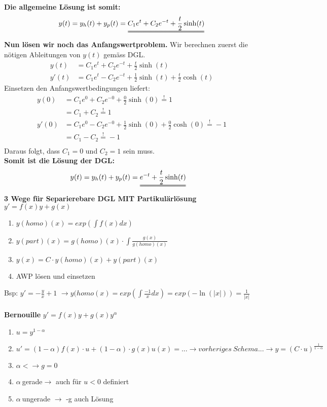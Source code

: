\textbf{Die allgemeine Lösung ist somit:}
\[
	y(t) = y_h(t) + y_p(t) = \uuline{C_1 e^t + C_2 e^{-t} + \frac{t}{2} \sinh(t)}
\]
\textbf{Nun lösen wir noch das Anfangswertproblem.} Wir berechnen zuerst die nötigen Ableitungen von $y(t)$ gemäss DGL. 
\begin{align*}
	y(t) &= C_1 e^t + C_2 e^{-t} + \frac{t}{2} \sinh(t) \\
	y'(t) &= C_1 e^t - C_2 e^{-t} + \frac{1}{2} \sinh(t) + \frac{t}{2} \cosh(t) 
\end{align*}
Einsetzen den Anfangswertbedingungen liefert:
\begin{align*}
	y(0) &= C_1 e^0 + C_2 e^{-0} + \frac{0}{2} \sinh(0) \overset{!}{=} 1 \\
		 &= C_1 + C_2 \overset{!}{=} 1 \\
	y'(0) &= C_1 e^0 - C_2 e^{-0} + \frac{1}{2} \sinh(0) + \frac{0}{2} \cosh(0)  \overset{!}{=} -1 \\
		  &= C_1 - C_2 \overset{!}{=} -1 \\
\end{align*}
Daraus folgt, dass $C_1 = 0$ und $C_2 = 1$ sein muss. \\
\textbf{Somit ist die Lösung der DGL:}
\begin{align*}
	y(t) &= y_h(t) + y_p(t) = \uuline{e^{-t} + \frac{t}{2} \sinh(t)}
\end{align*}
\textbf{3 Wege für Separierebare DGL MIT Partikulärlösung}
$y'=f(x)y+g(x)$
\begin{enumerate}
	\item $y(homo)(x)= exp(\int f(x)dx)$
	\item $y(part)(x) = g(homo)(x)\cdot \int\frac{g(x)}{g(homo)(x)}$
	\item $y(x) = C\cdot y(homo)(x) + y(part)(x)$
	\item AWP lösen und einsetzen 
\end{enumerate}
Bsp: $ y'= -\frac{y}{x} +1 $
$\rightarrow y(homo(x) = exp(\int\frac{-1}{x}dx) = exp(-\ln(|x|)) = \frac{1}{|x|}$\\
\\
\textbf{Bernouille}
$y' = f(x)y + g(x)y^\alpha$
\begin{enumerate}
	\item$ u = y^{1-\alpha}$
	\item$ u' = (1-\alpha)f(x)\cdot u +(1-\alpha)\cdot g(x)
	u(x) = ... \rightarrow vorheriges\ Schema... \rightarrow y=(C\cdot u)^{\frac{1}{1-\alpha}}$
	\item $\alpha < \rightarrow g = 0 $		
	\item $\alpha\ $gerade$ \rightarrow$ auch für $u < 0$ definiert
	\item $\alpha\ $ungerade $\rightarrow$ -g auch Lösung
\end{enumerate}


